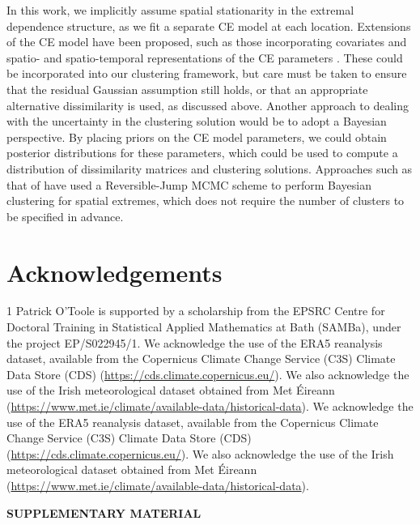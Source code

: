 \documentclass[12pt,compact]{article}
\newcommand{\blind}{1}
\begin{document}
In this work, we implicitly assume spatial stationarity in the extremal dependence structure, as we fit a separate CE model at each location.
Extensions of the CE model have been proposed, such as those incorporating covariates \citep{Richards2023} and spatio- and spatio-temporal representations of the CE parameters \citep{Simpson2021, Wadsworth2022}.
These could be incorporated into our clustering framework, but care must be taken to ensure that the residual Gaussian assumption still holds, or that an appropriate alternative dissimilarity is used, as discussed above.
Another approach to dealing with the uncertainty in the clustering solution would be to adopt a Bayesian perspective.
By placing priors on the CE model parameters, we could obtain posterior distributions for these parameters, which could be used to compute a distribution of dissimilarity matrices and clustering solutions.
Approaches such as that of \citet{Rohrbeck2021} have used a Reversible-Jump MCMC scheme to perform Bayesian clustering for spatial extremes, which does not require the number of clusters to be specified in advance.



\section*{Acknowledgements}

\blind
{%
Patrick O'Toole is supported by a scholarship from the EPSRC Centre for Doctoral Training in Statistical Applied Mathematics at Bath (SAMBa), under the project EP/S022945/1.
We acknowledge the use of the ERA5 reanalysis dataset, available from the Copernicus Climate Change Service (C3S) Climate Data Store (CDS) (\url{https://cds.climate.copernicus.eu/}). 
We also acknowledge the use of the Irish meteorological dataset obtained from Met Éireann (\url{https://www.met.ie/climate/available-data/historical-data}).
} 
\else
{%
We acknowledge the use of the ERA5 reanalysis dataset, available from the Copernicus Climate Change Service (C3S) Climate Data Store (CDS) (\url{https://cds.climate.copernicus.eu/}). 
We also acknowledge the use of the Irish meteorological dataset obtained from Met Éireann (\url{https://www.met.ie/climate/available-data/historical-data}).
}
\fi


\begin{center}
{\large\bf SUPPLEMENTARY MATERIAL}
\end{center}
\end{document}
